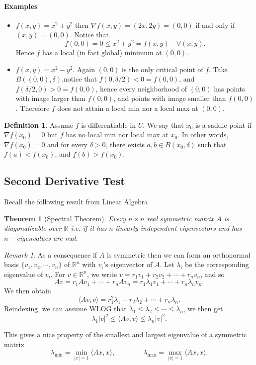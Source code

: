 \documentclass[11pt,openany]{book}
\theoremstyle{plain}
\newtheorem{theorem}{Theorem}[chapter]
\theoremstyle{definition}
\newtheorem{definition}{Definition}[chapter]
\theoremstyle{remark}
\newtheorem{remark}{Remark}[chapter]
\begin{document}
\paragraph{\bf Examples}   \begin{itemize}
        \item $f(x,y) = x^2+y^2$ then $\nabla f(x,y) = (2x, 2y) = (0,0)$ if and only if $(x,y) = (0,0)$. Notice that \[f(0,0) = 0 \le x^2+y^2 = f(x,y) \quad \forall (x,y).\] Hence $f$ has a local (in fact global) minimum at $(0,0)$.
        \item $f(x,y)=x^2-y^2$. Again $(0,0)$ is the only critical point of $f$. Take $B((0,0),\delta)$.notice that $f(0,\delta/2)<0=f(0,0)$, and $f(\delta/2,0)>0=f(0,0)$, hence every neighborhood of $(0,0)$ has points with image larger than $f(0,0)$, and points with image smaller than $f(0,0)$. Therefore $f$ does not attain  a local min nor a local max at $(0,0).$
    \end{itemize}

\begin{definition}
    Assume $f$ is differentiable in $U$. We say that $x_0$ is a saddle point if $\nabla f(x_0)=0$ but $f$ has no local min nor local max at $x_0$. In other words, $\nabla f(x_0)=0$ and for every $\delta>0$, there exists $a,b\in B(x_0,\delta)$ such that $f(a)<f(x_0)$, and $f(b)>f(x_0).$
\end{definition}
\subsection{Second Derivative Test}
 Recall the following result from Linear Algebra

\begin{theorem}[Spectral Theorem]
    Every $n \times n$ real symmetric matrix $A$ is diagonalizable over $\mathbb R$ i.e. if it has $n$-linearly independent eigenvectors and has $n-$eigenvalues are real. 
\end{theorem}

\begin{remark}\rm 
As a consequence if $A$ is symmetric then we can form an orthonormal basis $\{v_1,v_2,\cdots,v_n\}$ of $\mathbb R^n$ with $v_i$'s eigenvector of $A$. Let $\lambda_i$ be the corresponding eigenvalue of $v_i$. For $v\in \mathbb R^n$, we write $v=r_1 v_1+r_2v_2+\cdots+r_n v_n$, and so
$$Av=r_1Av_1+\cdots+r_nAv_n=r_1\lambda_1v_1+\cdots+r_n\lambda_nv_n.$$
We then obtain 
$$\langle Av,v\rangle=r_1^2\lambda_1+r_2\lambda_2+\cdots+r_n\lambda_n.$$
Reindexing, we can assume WLOG that $\lambda_1\leq \lambda_2\leq\cdots\leq \lambda_n$, we then get
$$\lambda_1|v|^2\leq \langle Av,v\rangle\leq \lambda_n|v|^2.$$

This gives a nice property of the smallest and largest eigenvalue of a symmetric matrix
$$\lambda_{\min}=\min_{|x|=1}\langle Ax,x\rangle,\qquad\qquad \lambda_{\max}=\max_{|x|=1}\langle Ax,x\rangle.$$
\end{remark}
\end{document}
